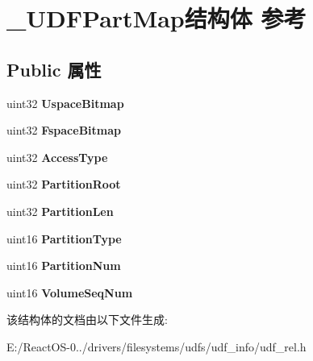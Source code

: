 \hypertarget{struct___u_d_f_part_map}{}\section{\+\_\+\+U\+D\+F\+Part\+Map结构体 参考}
\label{struct___u_d_f_part_map}
\subsection*{Public 属性}
\begin{DoxyCompactItemize}
\item 
\mbox{\label{struct___u_d_f_part_map_a1823d4a8374e751e2195d3f170aa48ad}} 
uint32 {\bfseries Uspace\+Bitmap}
\item 
\mbox{\label{struct___u_d_f_part_map_aeba4325e452a4c5585f496f55ecc0529}} 
uint32 {\bfseries Fspace\+Bitmap}
\item 
\mbox{\label{struct___u_d_f_part_map_a5a2507ecd6b0e61cb3d82da4ec67bed5}} 
uint32 {\bfseries Access\+Type}
\item 
\mbox{\label{struct___u_d_f_part_map_aa95567a98d59e90b6d62e3fc3ed00066}} 
uint32 {\bfseries Partition\+Root}
\item 
\mbox{\label{struct___u_d_f_part_map_a94d411add7049f4f4fc174fed50409e4}} 
uint32 {\bfseries Partition\+Len}
\item 
\mbox{\label{struct___u_d_f_part_map_a4da4667465b3f07d24885ab51e681dca}} 
uint16 {\bfseries Partition\+Type}
\item 
\mbox{\label{struct___u_d_f_part_map_a670e2eed41cce66eab493709c064de7b}} 
uint16 {\bfseries Partition\+Num}
\item 
\mbox{\label{struct___u_d_f_part_map_a987ad7915b66da37dd722b8e4153fb08}} 
uint16 {\bfseries Volume\+Seq\+Num}
\end{DoxyCompactItemize}


该结构体的文档由以下文件生成\+:\begin{DoxyCompactItemize}
\item 
E\+:/\+React\+O\+S-\/0../drivers/filesystems/udfs/udf\+\_\+info/udf\+\_\+rel.\+h\end{DoxyCompactItemize}
